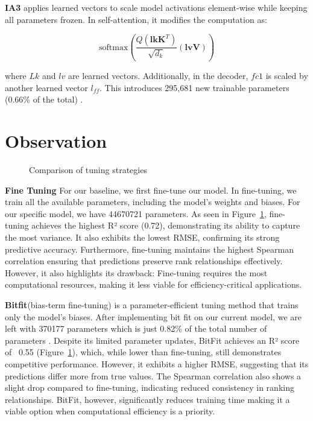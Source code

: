 \documentclass[11pt]{article}
\begin{document}
\textbf{IA3} applies learned vectors to scale model activations element-wise while keeping all parameters frozen. In self-attention, it modifies the computation as:

\[
\text{softmax}\left(\frac{Q(\mathbf{lk} \mathbf{K}^T)}{\sqrt{d_k}} (\mathbf{lv} \mathbf{V}) \right)
\]

where \( Lk \) and \( lv \) are learned vectors. Additionally, in the decoder, \( fc1 \) is scaled by another learned vector \( l_{ff} \). This introduces 295,681 new trainable parameters (0.66\% of the total) \cite{liu2022fewshotparameterefficientfinetuningbetter}.


\section*{Observation}

\begin{figure}[htp]
    \centering
    \caption{Comparison of tuning strategies }
    \label{fig:task3b}
\end{figure}

\textbf{Fine Tuning} For our baseline, we first fine-tune our model. In fine-tuning, we train all the available parameters, including the model's weights and biases. For our specific model, we have 44670721 parameters. As seen in Figure~\ref{fig:task3b}, fine-tuning achieves the highest R² score (0.72), demonstrating its ability to capture the most variance. It also exhibits the lowest RMSE, confirming its strong predictive accuracy. Furthermore, fine-tuning maintains the highest Spearman correlation ensuring that predictions preserve rank relationships effectively. However, it also highlights its drawback: Fine-tuning requires the most computational resources, making it less viable for efficiency-critical applications.


\textbf{Bitfit}(bias-term fine-tuning) is a parameter-efficient tuning method that trains only the model's biases. After implementing bit fit on our current model, we are left with 370177 parameters which is just 0.82\% of the total number of parameters \cite{zaken2022bitfit}. Despite its limited parameter updates, BitFit achieves an R² score of ~0.55 (Figure~\ref{fig:task3b}), which, while lower than fine-tuning, still demonstrates competitive performance. However, it exhibits a higher RMSE, suggesting that its predictions differ more from true values. The Spearman correlation also shows a slight drop compared to fine-tuning, indicating reduced consistency in ranking relationships. BitFit, however, significantly reduces training time making it a viable option when computational efficiency is a priority.
\end{document}
